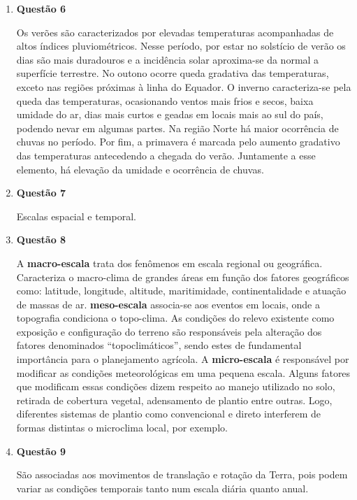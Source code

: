\documentclass[a4paper, 12pt]{article}
\begin{document}
\begin{enumerate}
		\item[]\textbf{Questão 6} 
		
		\hspace{1cm}Os verões são caracterizados por elevadas temperaturas acompanhadas de altos índices pluviométricos. Nesse período, por estar no solstício de verão os dias são mais duradouros e a incidência solar aproxima-se da normal a superfície terrestre. No outono ocorre queda gradativa das temperaturas, exceto nas regiões próximas à linha do Equador. O inverno caracteriza-se pela queda das temperaturas, ocasionando ventos mais frios e secos, baixa umidade do ar, dias mais curtos e geadas em locais mais ao sul do país, podendo nevar em algumas partes. Na região Norte há maior ocorrência de chuvas no período. Por fim, a primavera é marcada pelo aumento gradativo das temperaturas antecedendo a chegada do verão. Juntamente a esse elemento, há elevação da umidade e ocorrência de chuvas.
		
		\item[]\textbf{Questão 7} 
		
		\hspace{1cm}Escalas espacial e temporal.
		
		\item[]\textbf{Questão 8}
		
		\hspace{1cm}A \textbf{macro-escala} trata dos fenômenos em escala regional ou geográfica. Caracteriza o macro-clima de grandes áreas em função dos fatores geográficos como: latitude, longitude, altitude, maritimidade, continentalidade e atuação de massas de ar. \textbf{meso-escala} associa-se aos eventos em locais, onde a topografia condiciona o topo-clima. As condições do relevo existente como exposição e configuração do terreno são responsáveis pela alteração dos fatores denominados ``topoclimáticos'', sendo estes de fundamental importância para o planejamento agrícola. A \textbf{micro-escala} é responsável por modificar as condições meteorológicas em uma pequena escala. Alguns fatores que modificam essas condições dizem respeito ao manejo utilizado no solo, retirada de cobertura vegetal, adensamento de plantio entre outras. Logo, diferentes sistemas de plantio como convencional e direto interferem de formas distintas o microclima local, por exemplo.
		
		\item[]\textbf{Questão 9} 
		
		\hspace{1cm}São associadas aos movimentos de translação e rotação da Terra, pois podem variar as condições temporais tanto num escala diária quanto anual.
		

\end{enumerate}
\end{document}
